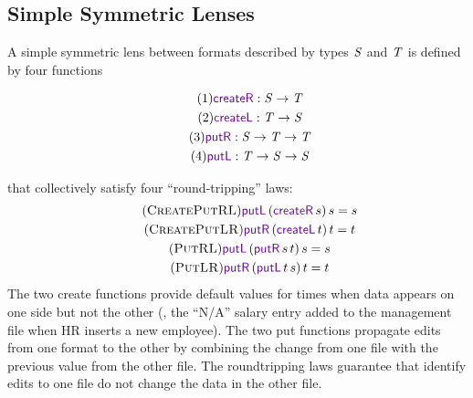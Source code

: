\documentclass[acmsmall,screen,anonymous]{acmart}
\begin{document}
\subsection{Simple Symmetric Lenses}
A simple symmetric lens between formats described by types $\mathit{S}$
and $\mathit{T}$ 
is defined by four functions


\begin{gather}
 \tag{1}
 \mbox{$\CreateR \OfType \Regex \rightarrow \RegexAlt$}\\
 \tag{2}
 \mbox{$\CreateL \OfType \RegexAlt \rightarrow \Regex$}\\
 \tag{3}
 \mbox{$\PutR \OfType \Regex \rightarrow \RegexAlt \rightarrow \RegexAlt$}\\
 \tag{4}
 \mbox{$\PutL \OfType \RegexAlt \rightarrow \Regex \rightarrow \Regex$}
\end{gather}

\noindent
that collectively satisfy four ``round-tripping'' laws: 
\begin{gather}
  \tag{\CreatePutRL}
  \PutLOf{(\CreateROf{s})}{s} = s\\
  \tag{\CreatePutLR}
  \PutROf{(\CreateLOf{t})}{t} = t\\
  \tag{\PutRL}
  \PutLOf{(\PutROf{s}{t})}{s} = s\\
  \tag{\PutLR}
  \PutROf{(\PutLOf{t}{s})}{t} = t
\end{gather}
\noindent
The two create functions provide default values for times when
data appears on one side but not the other (\EG, the ``N/A'' salary
entry added to the management file when HR inserts a new employee).
The two put functions propagate edits from one format to the
other by combining the change from one file with the previous value
from the other file. The roundtripping laws guarantee that identify edits to one file do
not change the data in the other file. 
\end{document}
